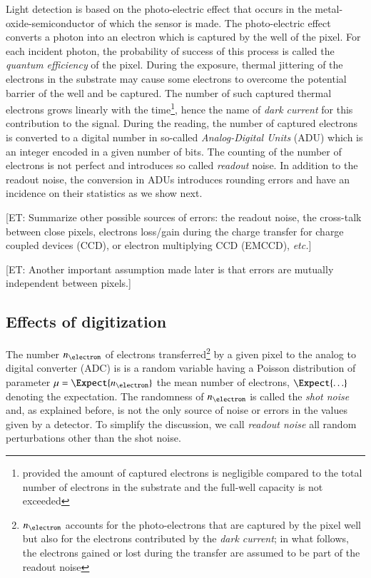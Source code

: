 \documentclass{aa}
\newcommand{\oops}[1]{\textcolor[named]{OrangeRed1}{#1}}
\newcommand*{\etc}{\emph{etc.}\xspace}
\begin{document}
Light detection is based on the photo-electric effect that occurs in the
metal-oxide-semiconductor of which the sensor is made. The photo-electric
effect converts a photon into an electron which is captured by the well of the
pixel.  For each incident photon, the probability of success of this process is
called the \emph{quantum efficiency} of the pixel.  During the exposure,
thermal jittering of the electrons in the substrate may cause some electrons to
overcome the potential barrier of the well and be captured.  The number of such
captured thermal electrons grows linearly with the time\footnote{provided the
  amount of captured electrons is negligible compared to the total number of
  electrons in the substrate and the full-well capacity is not exceeded}, hence
the name of \emph{dark current} for this contribution to the signal. During the
reading, the number of captured electrons is converted to a digital number in
so-called \emph{Analog-Digital Units} (ADU) which is an integer encoded in a
given number of bits.  The counting of the number of electrons is not perfect
and introduces so called \emph{readout} noise.  In addition to the readout
noise, the conversion in ADUs introduces rounding errors and have an incidence
on their statistics as we show next.

\oops{[ET: Summarize other possible sources of errors: the readout noise, the
cross-talk between close pixels, electrons loss/gain during the charge transfer
for charge coupled devices (CCD), or electron multiplying CCD (EMCCD), \etc]}

\oops{[ET: Another important assumption made later is that errors are mutually
independent between pixels.]}


\subsection{Effects of digitization}
\label{sec:digitization}

The number $n_{\electron}$ of electrons transferred\footnote{$n_{\electron}$
accounts for the photo-electrons that are captured by the pixel well but also
for the electrons contributed by the \emph{dark current}; in what follows, the
electrons gained or lost during the transfer are assumed to be part of the
readout noise} by a given pixel to the analog to digital converter (ADC) is is
a random variable having a Poisson distribution of parameter $\mu =
\Expect{n_\electron}$ the mean number of electrons, $\Expect{\ldots}$ denoting
the expectation.  The randomness of $n_\electron$ is called the \emph{shot
noise} and, as explained before, is not the only source of noise or errors in
the values given by a detector.  To simplify the discussion, we call
\emph{readout noise} all random perturbations other than the shot noise.
\end{document}
